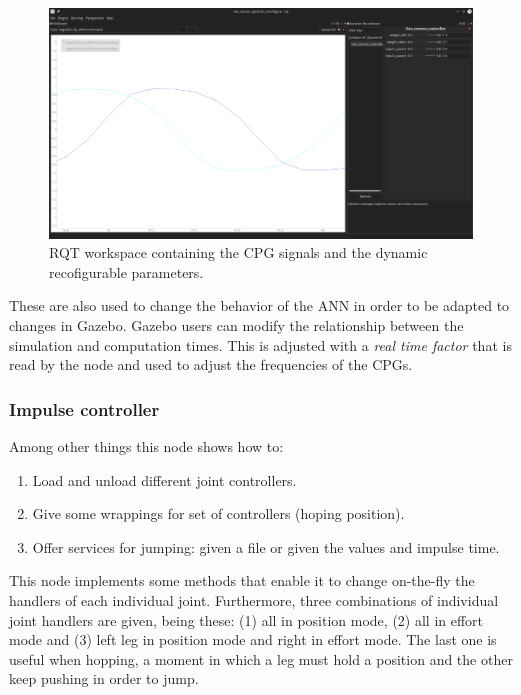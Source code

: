 \begin{figure}[tb]
    \centering
    \includegraphics[width=\textwidth]{figures/rqt_interface}
    \caption{RQT workspace containing the CPG signals and the dynamic recofigurable parameters.}
    \label{fig:rqt_interface}
\end{figure}

These are also used to change the behavior of the ANN in order to be adapted to changes in Gazebo.
Gazebo users can modify the relationship between the simulation and computation times.
This is adjusted with a \textit{real time factor} that is read by the node and used to adjust the frequencies of the CPGs.

\subsubsection{Impulse controller} %
\label{ssub:impulse_controller}
Among other things this node shows how to:
\begin{enumerate}
    \item Load and unload different joint controllers.
    \item Give some wrappings for set of controllers (hoping position).
    \item Offer services for jumping: given a file or given the values and impulse time.
\end{enumerate}
This node implements some methods that enable it to change on-the-fly the handlers of each individual joint.
Furthermore, three combinations of individual joint handlers are given, being these: (1) all in position mode, (2) all in effort mode and (3) left leg in position mode and right in effort mode.
The last one is useful when hopping, a moment in which a leg must hold a position and the other keep pushing in order to jump.

